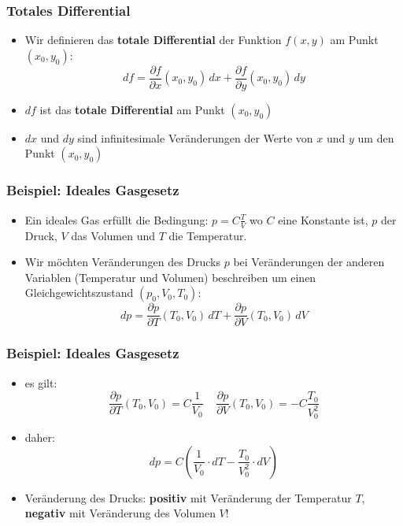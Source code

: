 \begin{frame}
    \frametitle{Totales Differential}
    
    \begin{itemize}
        \item Wir definieren das {\bf totale Differential} der Funktion $f(x,y)$ am Punkt $(x_0,y_0)$:
        $$
        df = \frac{\partial f}{\partial x}(x_0,y_0)\,dx +\frac{\partial f}{\partial y}(x_0,y_0)\,dy
        $$
        \item $df$ ist das {\bf totale Differential} am Punkt $(x_0,y_0)$
        \item $dx$ und $dy$ sind infinitesimale Veränderungen der Werte von $x$ und $y$ um den Punkt $(x_0,y_0)$
    \end{itemize}

\end{frame}

\begin{frame}
    \frametitle{Beispiel: Ideales Gasgesetz}

    \begin{itemize}
        \item Ein ideales Gas erfüllt die Bedingung: $p = C\frac{T}{V}$ wo $C$ eine Konstante ist, $p$ der Druck, $V$ das Volumen und $T$ die Temperatur.
        \item Wir möchten Veränderungen des Drucks $p$ bei Veränderungen der anderen Variablen (Temperatur und Volumen) beschreiben um einen Gleichgewichtszustand $(p_0,V_0,T_0)$:
        \begin{equation}
        dp = \frac{\partial p}{\partial T}(T_0,V_0)\,dT +\frac{\partial p}{\partial V}(T_0,V_0)\,dV
        \end{equation}
    \end{itemize}
\end{frame}

\begin{frame}
    \frametitle{Beispiel: Ideales Gasgesetz}

    \begin{itemize}
        \item es gilt:
        $$
        \frac{\partial p}{\partial T}(T_0,V_0) = C\frac{1}{V_0}~~~~~\frac{\partial p}{\partial V}(T_0,V_0) = -C\frac{T_0}{V_0^2}
        $$
        \item daher:
        \begin{equation}
        dp = C\left( \frac{1}{V_0}\cdot dT -\frac{T_0}{V_0^2}\cdot dV\right)
        \end{equation}
        \item Veränderung des Drucks: {\bf positiv} mit Veränderung der Temperatur $T$, {\bf negativ} mit Veränderung des Volumen $V$!
    \end{itemize}
\end{frame}



